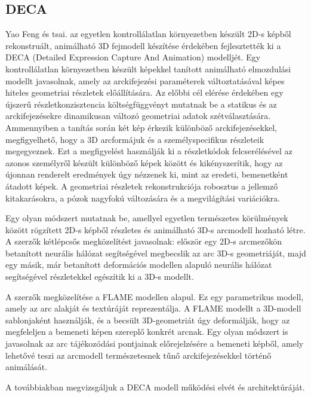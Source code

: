 \documentclass[12pt,a4]{article}
\begin{document}
        \subsection{DECA} \label{DECA}
 	
            Yao Feng és tsai. \cite{deca} az egyetlen kontrollálatlan környezetben készült 2D-s képből rekonstruált, animálható 3D fejmodell készítése érdekében fejlesztették ki a DECA (Detailed Expression Capture And Animation) modelljét. Egy kontrollálatlan környezetben készült képekkel tanított animálható elmozdulási modellt javasolnak, amely az arckifejezési paraméterek változtatásával képes hiteles geometriai részletek előállítására. Az előbbi cél elérése érdekében egy újszerű részletkonzisztencia költségfüggvényt mutatnak be a statikus és az arckifejezésekre dinamikusan változó geometriai adatok szétválasztására. Ammennyiben a tanítás során két kép érkezik különböző arckifejezésekkel, megfigyelhető, hogy a 3D arcformájuk és a személyspecifikus részleteik megegyeznek. Ezt a megfigyelést használják ki a részletkódok felcserélésével az azonos személyről készült különböző képek között és kikényszerítik, hogy az újonnan renderelt eredmények úgy nézzenek ki, mint az eredeti, bemenetként átadott képek. A geometriai részletek rekonstrukciója robosztus a jellemző kitakarásokra, a pózok nagyfokú változására és a megvilágítási variációkra.
    
            Egy olyan módszert mutatnak be, amellyel egyetlen természetes körülmények között rögzített 2D-s képből részletes és animálható 3D-s arcmodell hozható létre. A szerzők kétlépcsős megközelítést javasolnak: először egy 2D-s arcmezőkön betanított neurális hálózat segítségével megbecslik az arc 3D-s geometriáját, majd egy másik, már betanított deformációs modellen alapuló neurális hálózat segítségével részletekkel egészítik ki a 3D-s modellt.
    
            A szerzők megközelítése a FLAME modellen alapul. Ez egy parametrikus modell, amely az arc alakját és textúráját reprezentálja. A FLAME modellt a 3D-modell sablonjaként használják, és a becsült 3D-geometriát úgy deformálják, hogy az megfeleljen a bemeneti képen szereplő konkrét arcnak. Egy olyan módszert is javasolnak az arc tájékozódási pontjainak előrejelzésére a bemeneti képből, amely lehetővé teszi az arcmodell természetesnek tűnő arckifejezésekkel történő animálását.
    
        
     	      A továbbiakban megvizsgáljuk a DECA modell működési elvét és architektúráját.
\end{document}
